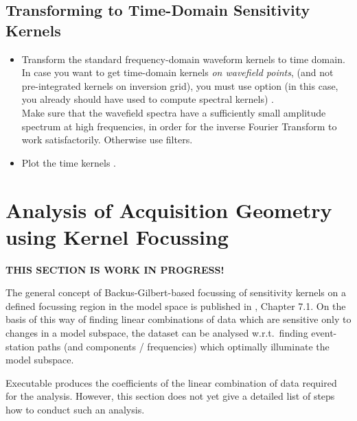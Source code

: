 \subsection*{Transforming to Time-Domain Sensitivity Kernels}
%
\begin{itemize}
\item Transform the standard frequency-domain waveform kernels to time domain. In case you want to get  
  time-domain kernels \emph{on wavefield points}, (and not pre-integrated kernels on inversion grid),
  you must use option  (in this case, you already should have used  to compute 
  spectral kernels) .\\
  Make sure that the wavefield spectra have a sufficiently small amplitude spectrum at high frequencies, in order for the
  inverse Fourier Transform to work satisfactorily. Otherwise use filters.
%
\item Plot the time kernels .
\end{itemize}
%
\newpage
\section{Analysis of Acquisition Geometry using Kernel Focussing} \label{guide,sec:acq_ana_focus}
%
{\bf THIS SECTION IS WORK IN PROGRESS!}

The general concept of Backus-Gilbert-based focussing of sensitivity kernels on a defined focussing region 
in the model space is published in \cite{_743d334d-dfa4-4a16-8cc5-91cdadc95271}, Chapter 7.1. On the basis
of this way of finding linear combinations of data which are sensitive only to changes in a model subspace, 
the dataset can be analysed w.r.t.\ finding event-station paths (and components / frequencies) which optimally
illuminate the model subspace. 

Executable   produces the coefficients of the linear combination of data required
for the analysis. However, this section does not yet give a detailed list of steps how to conduct such 
an analysis. 

